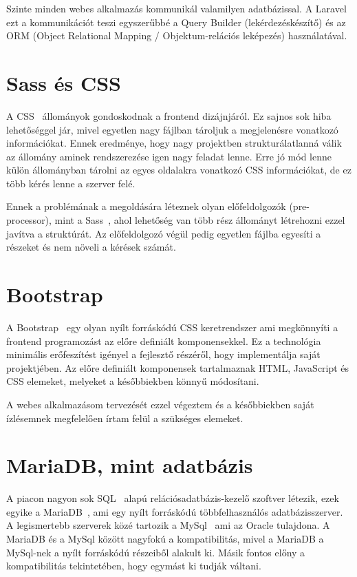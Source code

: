 \documentclass[
]{thesis-ekf}
\theoremstyle{definition}
\theoremstyle{remark}
\begin{document}
Szinte minden webes alkalmazás kommunikál valamilyen adatbázissal. A Laravel ezt a kommunikációt teszi egyszerűbbé a Query Builder (lekérdezéskészítő) és az ORM (Object Relational Mapping / Objektum-relációs leképezés) használatával. 

\section{Sass és CSS}
A CSS~\cite{css_doc} állományok gondoskodnak a frontend dizájnjáról. Ez sajnos sok hiba lehetőséggel jár, mivel egyetlen nagy fájlban tároljuk a megjelenésre vonatkozó információkat. Ennek eredménye, hogy nagy projektben strukturálatlanná válik az állomány aminek rendszerezése igen nagy feladat lenne. Erre jó mód lenne külön állományban tárolni az egyes oldalakra vonatkozó CSS információkat, de ez több kérés lenne a szerver felé. 

Ennek a problémának a megoldására léteznek olyan előfeldolgozók (pre-processor), mint a Sass~\cite{sass_doc}, ahol lehetőség van több rész állományt létrehozni ezzel javítva a struktúrát. Az előfeldolgozó végül pedig egyetlen fájlba egyesíti a részeket és nem növeli a kérések számát. 

\section{Bootstrap}
A Bootstrap~\cite{bootstrap_doc} egy olyan nyílt forráskódú CSS keretrendszer ami megkönnyíti a frontend programozást az előre definiált komponensekkel. Ez a technológia minimális erőfeszítést igényel a fejlesztő részéről, hogy implementálja saját projektjében. Az előre definiált komponensek tartalmaznak HTML, JavaScript és CSS elemeket, melyeket a későbbiekben könnyű módosítani.

A webes alkalmazásom tervezését ezzel végeztem és a későbbiekben saját ízlésemnek megfelelően írtam felül a szükséges elemeket. 

\section{MariaDB, mint adatbázis}
A piacon nagyon sok SQL~\cite{sql_book} alapú relációsadatbázis-kezelő szoftver létezik, ezek egyike a MariaDB~\cite{mariadb_doc}, ami egy nyílt forráskódú többfelhasználós adatbázisszerver. A legismertebb szerverek közé tartozik a MySql~\cite{mysql_book} ami az Oracle tulajdona. A MariaDB és a MySql között nagyfokú a kompatibilitás, mivel a MariaDB a MySql-nek a nyílt forráskódú részeiből alakult ki. Másik fontos előny a kompatibilitás tekintetében, hogy egymást ki tudják váltani.
\end{document}
